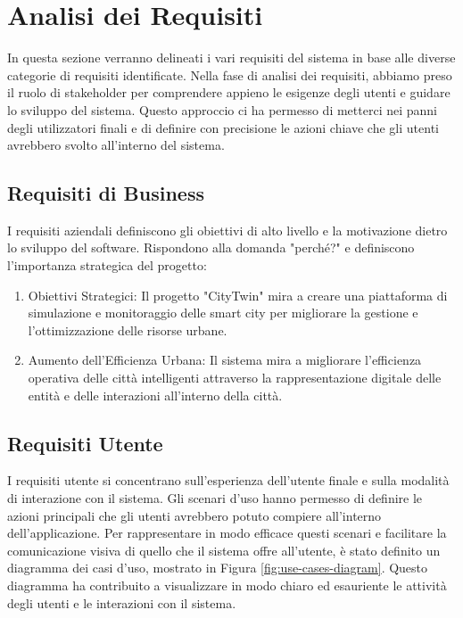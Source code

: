 \documentclass{scrartcl}
\begin{document}
\newpage

\tableofcontents

\newpage

\section{Analisi dei Requisiti}
In questa sezione verranno delineati i vari requisiti del sistema in base alle diverse categorie di requisiti identificate. Nella fase di analisi dei requisiti, abbiamo preso il ruolo di stakeholder per comprendere appieno le esigenze degli utenti e guidare lo sviluppo del sistema. Questo approccio ci ha permesso di metterci nei panni degli utilizzatori finali e di definire con precisione le azioni chiave che gli utenti avrebbero svolto all'interno del sistema.

\subsection{Requisiti di Business}
I requisiti aziendali definiscono gli obiettivi di alto livello e la motivazione dietro lo sviluppo del software. Rispondono alla domanda "perché?" e definiscono l'importanza strategica del progetto:
\begin{enumerate}
    \item Obiettivi Strategici: Il progetto "CityTwin" mira a creare una piattaforma di simulazione e monitoraggio delle smart city per migliorare la gestione e l'ottimizzazione delle risorse urbane.
    \item Aumento dell'Efficienza Urbana: Il sistema mira a migliorare l'efficienza operativa delle città intelligenti attraverso la rappresentazione digitale delle entità e delle interazioni all'interno della città.
\end{enumerate}

\subsection{Requisiti Utente}
I requisiti utente si concentrano sull'esperienza dell'utente finale e sulla modalità di interazione con il sistema.
Gli scenari d'uso hanno permesso di definire le azioni principali che gli utenti avrebbero potuto compiere all'interno dell'applicazione.
Per rappresentare in modo efficace questi scenari e facilitare la comunicazione visiva di quello che il sistema offre all'utente, è stato definito un diagramma dei casi d'uso, mostrato in Figura \ref{fig:use-cases-diagram}. Questo diagramma ha contribuito a visualizzare in modo chiaro ed esauriente le attività degli utenti e le interazioni con il sistema.
\end{document}
